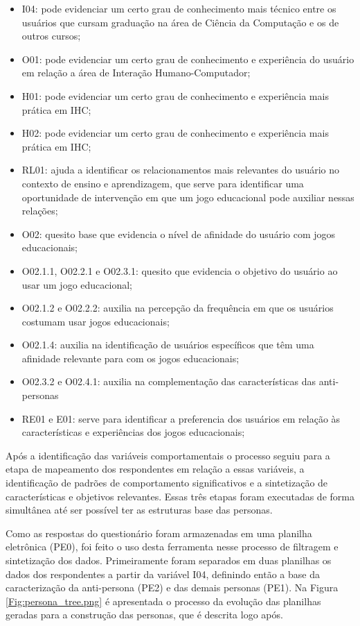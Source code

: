 \begin{apendicesenv}
\begin{itemize}
    \item I04: pode evidenciar um certo grau de conhecimento mais técnico entre os usuários que cursam graduação na área de Ciência da Computação e os de outros cursos;
    \item O01: pode evidenciar um certo grau de conhecimento e experiência do usuário em relação a área de Interação Humano-Computador;
    \item H01: pode evidenciar um certo grau de conhecimento e experiência mais prática em IHC;
    \item H02: pode evidenciar um certo grau de conhecimento e experiência mais prática em IHC;
    \item RL01: ajuda a identificar os relacionamentos mais relevantes do usuário no contexto de ensino e aprendizagem, que serve para identificar uma oportunidade de intervenção em que um jogo educacional pode auxiliar nessas relações;
    \item O02: quesito base que evidencia o nível de afinidade do usuário com jogos educacionais;
    \item O02.1.1, O02.2.1 e O02.3.1: quesito que evidencia o objetivo do usuário ao usar um jogo educacional;
    \item O02.1.2 e O02.2.2: auxilia na percepção da frequência em que os usuários costumam usar jogos educacionais;
    \item O02.1.4: auxilia na identificação de usuários específicos que têm uma afinidade relevante para com os jogos educacionais; 
    \item O02.3.2 e O02.4.1: auxilia na complementação das características das anti-personas
    \item RE01 e E01: serve para identificar a preferencia dos usuários em relação às características e experiências dos jogos educacionais;
\end{itemize}

Após a identificação das variáveis comportamentais o processo seguiu para a etapa de mapeamento dos respondentes em relação a essas variáveis, a identificação de padrões de comportamento significativos e a sintetização de características e objetivos relevantes. Essas três etapas foram executadas de forma simultânea até ser possível ter as estruturas base das personas. 

Como as respostas do questionário foram armazenadas em uma planilha eletrônica (PE0), foi feito o uso desta ferramenta nesse processo de filtragem e sintetização dos dados. Primeiramente foram separados em duas planilhas os dados dos respondentes a partir da variável I04, definindo então a base da caracterização da anti-persona (PE2) e das demais personas (PE1). Na Figura \ref{Fig:persona_tree.png} é apresentada o processo da evolução das planilhas geradas para a construção das personas, que é descrita logo após.


\end{apendicesenv}
